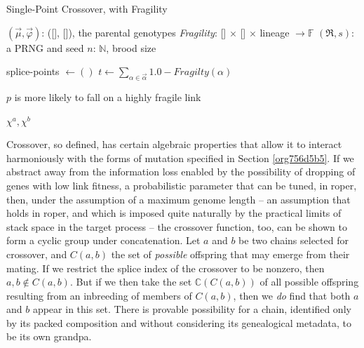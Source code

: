 \documentclass[12pt,glossary]{dalthesis}
\begin{document}
\begin{algorithm}
\caption{Single-Point Crossover, with Fragility} \label{alg:crossover}
\begin{algorithmic}[1]

\REQUIRE $(\vec{\mu}, \vec{\varphi})$: ([\!], [\!]), the parental genotypes 
\REQUIRE \emph{Fragility}: [\!] $\times$ [\!] $\times$ lineage $\to \mathbb{F}$ 
\REQUIRE $(\mathfrak{R}, s)$: a PRNG and seed \REQUIRE $n$: $\mathbb{N}$, brood size


\STATE
{splice-points $\gets ()$}  \FOR {$\vec{\alpha} \in (\vec{\mu }, \vec{\varphi})$} 
\STATE
{$t \gets \sum_{\alpha \in \vec{\alpha}} 1.0 - \textit{Fragilty}(\alpha)$}

 \COMMENT
{$p$ is more likely to fall on a highly fragile link} 

  
 \ENDWHILE 
{} \ENDFOR 
{} 

 \RETURN
{$\chi^a, \chi^b$} 
\end{algorithmic} 
\end{algorithm}

Crossover, so defined, has certain algebraic properties that allow it
to interact harmoniously with the forms of mutation specified in 
Section \ref{org756d5b5}. If we abstract away from the information loss
enabled by the possibility of dropping of genes with low link fitness, a
probabilistic parameter that can be tuned, in \gls{roper}, then, under the
assumption of a maximum genome length -- an assumption that holds in \gls{roper},
and which is imposed quite naturally by the practical limits of stack space in
the target process -- the crossover function, too, can be shown to form a cyclic group
under concatenation. Let \(a\) and \(b\) be two chains selected for crossover, and 
\(C(a,b)\) the set of \emph{possible} offspring that may emerge from their mating. If
we restrict the splice index of the crossover to be nonzero, then \(a,b \not \in C(a,b)\).
But if we then take the set \(\mathbb{C}(C(a,b))\) of all possible offspring resulting
from an inbreeding of members of \(C(a,b)\), then we \emph{do} find that both \(a\) and \(b\)
appear in this set. There is provable possibility for a chain, identified only by
its packed composition and without considering its genealogical metadata, to be its
own grandpa. 
\end{document}
